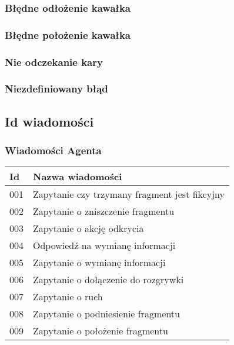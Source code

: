 \documentclass[Dokumentacja.tex]{subfiles}
\begin{document}
\subsubsection{Błędne odłożenie kawałka}


\subsubsection{Błędne położenie kawałka}


\subsubsection{Nie odczekanie kary}


\subsubsection{Niezdefiniowany błąd}


\subsection{Id wiadomości}

\subsubsection{Wiadomości Agenta}
\begin{tabular}{ |p{1cm}|p{12cm}| }
 \hline
 Id & Nazwa wiadomości \\
 \hline
 001 & Zapytanie czy trzymany fragment jest fikcyjny \\
 002 & Zapytanie o zniszczenie fragmentu \\
 003 & Zapytanie o akcję odkrycia \\
 004 & Odpowiedź na wymianę informacji \\
 005 & Zapytanie o wymianę informacji \\
 006 & Zapytanie o dołączenie do rozgrywki \\
 007 & Zapytanie o ruch \\
 008 & Zapytanie o podniesienie fragmentu \\
 009 & Zapytanie o położenie fragmentu \\
 \hline
\end{tabular}
\end{document}
